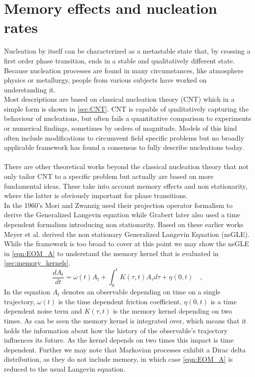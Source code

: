 \section{Memory effects and nucleation rates}
\label{sec:memory_approach}
Nucleation by itself can be characterized as a metastable state that, by crossing a first order phase transition, ends in a stable and qualitatively different state. Because nucleation processes are found in many circumstances, like atmosphere physics or metallurgy, people from various subjects have worked on understanding it.\\

Most descriptions are based on classical nucleation theory (CNT) which in a simple form is shown in \autoref{sec:CNT}. CNT is capable of qualitatively capturing the behaviour of nucleations, but often fails a quantitative comparison to experiments or numerical findings, sometimes by orders of magnitude. Models of this kind often include modifications to circumvent field specific problems but no broadly applicable framework has found a consensus to fully describe nucleations today\cite{MeyerThesis}.\\

\\

There are other theoretical works beyond the classical nucleation theory that not only tailor CNT to a specific problem but actually are based on more fundamental ideas. These take into account memory effects and non stationarity, where the latter is obviously important for phase transitions.\\

In the 1960's Mori and Zwanzig used their projection operator formalism to derive the Generalized Langevin equation while Grabert later also used a time dependent formalism introducing non stationarity. Based on these earlier works Meyer et al. derived the non stationary Generalized Langevin Equation (nsGLE)\cite{Meyer_nsGLE}. While the framework is too broad to cover at this point we may show the nsGLE in \autoref{eqn:EOM_A} to understand the memory kernel that is evaluated in \autoref{sec:memory_kernels}.
\begin{equation}
\label{eqn:EOM_A}
  \frac{d A_{t}}{dt} = \omega (t) A_{t} + \int_{0}^{t} K(\tau, t) A_{\tau} d\tau + \eta(0,t) \quad ,
\end{equation}
In the equation $A_{t}$ denotes an observable depending on time on a single trajectory, $\omega (t)$ is the time dependent friction coefficient, $\eta(0,t)$ is a time dependent noise term and $K(\tau, t)$ is the memory kernel depending on two times. As can be seen the memory kernel is integrated over, which means that it holds the information about how the history of the observable's trajectory influences its future. As the kernel depends on two times this impact is time dependent. Further we may note that Markovian processes exhibit a Dirac delta distribution, as they do not include memory, in which case \autoref{eqn:EOM_A} is reduced to the usual Langevin equation.\\

